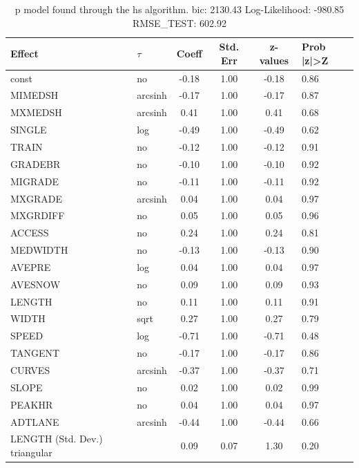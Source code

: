 \begin{table}
	\caption{p model found through the hs algorithm. bic: 2130.43 Log-Likelihood: -980.85 RMSE_TEST: 602.92}
	\begin{center}
		\begin{tabular}{|l|l|c|c|c|l|}
			\hline
			Effect & $\tau$ & Coeff & Std. Err & z-values & Prob |z|>Z \\
			\hline
			const & no & -0.18 & 1.00 & -0.18 & 0.86 \\
			\hline
			MIMEDSH & arcsinh & -0.17 & 1.00 & -0.17 & 0.87 \\
			\hline
			MXMEDSH & arcsinh & 0.41 & 1.00 & 0.41 & 0.68 \\
			\hline
			SINGLE & log & -0.49 & 1.00 & -0.49 & 0.62 \\
			\hline
			TRAIN & no & -0.12 & 1.00 & -0.12 & 0.91 \\
			\hline
			GRADEBR & no & -0.10 & 1.00 & -0.10 & 0.92 \\
			\hline
			MIGRADE & no & -0.11 & 1.00 & -0.11 & 0.92 \\
			\hline
			MXGRADE & arcsinh & 0.04 & 1.00 & 0.04 & 0.97 \\
			\hline
			MXGRDIFF & no & 0.05 & 1.00 & 0.05 & 0.96 \\
			\hline
			ACCESS & no & 0.24 & 1.00 & 0.24 & 0.81 \\
			\hline
			MEDWIDTH & no & -0.13 & 1.00 & -0.13 & 0.90 \\
			\hline
			AVEPRE & log & 0.04 & 1.00 & 0.04 & 0.97 \\
			\hline
			AVESNOW & no & 0.09 & 1.00 & 0.09 & 0.93 \\
			\hline
			LENGTH & no & 0.11 & 1.00 & 0.11 & 0.91 \\
			\hline
			WIDTH & sqrt & 0.27 & 1.00 & 0.27 & 0.79 \\
			\hline
			SPEED & log & -0.71 & 1.00 & -0.71 & 0.48 \\
			\hline
			TANGENT & no & -0.17 & 1.00 & -0.17 & 0.86 \\
			\hline
			CURVES & arcsinh & -0.37 & 1.00 & -0.37 & 0.71 \\
			\hline
			SLOPE & no & 0.02 & 1.00 & 0.02 & 0.99 \\
			\hline
			PEAKHR & no & 0.04 & 1.00 & 0.04 & 0.97 \\
			\hline
			ADTLANE & arcsinh & -0.44 & 1.00 & -0.44 & 0.66 \\
			\hline
			LENGTH (Std. Dev.) triangular &  & 0.09 & 0.07 & 1.30 & 0.20 \\
			\hline

\end{tabular}
\end{center}
\end{table}
